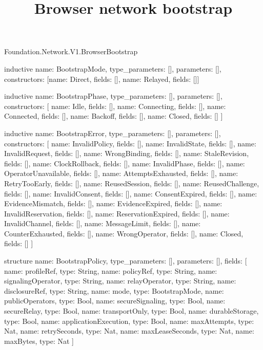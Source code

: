 \begin{lexlean}{Foundation.Network.V1.BrowserBootstrap}
\title{Browser network bootstrap}
\begin{semanticmodule}
inductive{
  name: BootstrapMode,
  type_parameters: [],
  parameters: [],
  constructors: [{name: Direct, fields: []}, {name: Relayed, fields: []}]
}

inductive{
  name: BootstrapPhase,
  type_parameters: [],
  parameters: [],
  constructors: [
    {name: Idle, fields: []},
    {name: Connecting, fields: []},
    {name: Connected, fields: []},
    {name: Backoff, fields: []},
    {name: Closed, fields: []}
  ]
}

inductive{
  name: BootstrapError,
  type_parameters: [],
  parameters: [],
  constructors: [
    {name: InvalidPolicy, fields: []},
    {name: InvalidState, fields: []},
    {name: InvalidRequest, fields: []},
    {name: WrongBinding, fields: []},
    {name: StaleRevision, fields: []},
    {name: ClockRollback, fields: []},
    {name: InvalidPhase, fields: []},
    {name: OperatorUnavailable, fields: []},
    {name: AttemptsExhausted, fields: []},
    {name: RetryTooEarly, fields: []},
    {name: ReusedSession, fields: []},
    {name: ReusedChallenge, fields: []},
    {name: InvalidConsent, fields: []},
    {name: ConsentExpired, fields: []},
    {name: EvidenceMismatch, fields: []},
    {name: EvidenceExpired, fields: []},
    {name: InvalidReservation, fields: []},
    {name: ReservationExpired, fields: []},
    {name: InvalidChannel, fields: []},
    {name: MessageLimit, fields: []},
    {name: CounterExhausted, fields: []},
    {name: WrongOperator, fields: []},
    {name: Closed, fields: []}
  ]
}

structure{
  name: BootstrapPolicy,
  type_parameters: [],
  parameters: [],
  fields: [
    {name: profileRef, type: String},
    {name: policyRef, type: String},
    {name: signalingOperator, type: String},
    {name: relayOperator, type: String},
    {name: disclosureRef, type: String},
    {name: mode, type: BootstrapMode},
    {name: publicOperators, type: Bool},
    {name: secureSignaling, type: Bool},
    {name: secureRelay, type: Bool},
    {name: transportOnly, type: Bool},
    {name: durableStorage, type: Bool},
    {name: applicationExecution, type: Bool},
    {name: maxAttempts, type: Nat},
    {name: retrySeconds, type: Nat},
    {name: maxLeaseSeconds, type: Nat},
    {name: maxBytes, type: Nat}
  ]
}


\end{semanticmodule}
\end{lexlean}
